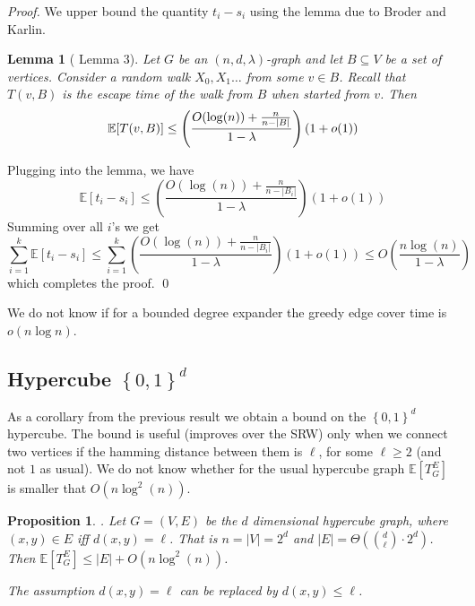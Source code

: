 \documentclass[12pt,a4paper]{article}
\newcommand{\zo}{ \left\{0,1\right\} }
\newcommand{\0}{{\bf 0}}
\newcommand{\seq}{\subseteq}
\newcommand{\E}{{\mathbb E}}
\newtheorem{proposition}[theorem]{Proposition}
\newtheorem{lemma}[theorem]{Lemma}
\begin{document}
    \begin{proof}
    We upper bound the quantity $t_i - s_i$ using the lemma due to Broder and Karlin.

    \begin{lemma}[\cite{BroderKarlin89} Lemma 3]
        Let $G$ be an $(n,d,\lambda)$-graph and let $B \seq V$ be a set of vertices.
        Consider a random walk $X_0, X_1 \dots$ from some $v \in B$.
        Recall that $T(v,B)$ is the escape time of the walk from $B$ when started from $v$.
        Then
        \[
            \E[T(v,B)] \leq \left( \frac{O( \log(n) ) + \frac{n}{n-|B|}}{1 - \lambda} \right) (1 + o(1))
    \qedhere\]
    \end{lemma}
    Plugging into the lemma, we have
    \[
        \E[t_i - s_i]  \leq  \left( \frac{O( \log(n) ) + \frac{n}{n-|B_i|}}{1 - \lambda} \right) (1 + o(1))
    \]
    Summing over all $i$'s we get
    \[
        \sum_{i=1}^{k} \E[t_i - s_i] \leq \sum_{i=1}^k \left( \frac{O( \log(n) ) + \frac{n}{n-|B_i|}}{1 - \lambda} \right) (1 + o(1))
                \leq O \left(\frac{n \log(n)}{1 - \lambda} \right)
    \]
    which completes the proof. \qed
    \end{proof}

    We do not know if for a bounded degree expander the greedy edge cover time is $o(n \log n)$.

\subsection{Hypercube $\zo^d$}\label{subsec:zo^d}

    As a corollary from the previous result we obtain a bound on the $\zo^d$ hypercube.
    The bound is useful (improves over the SRW) only
    when we connect two vertices if the hamming distance between them is $\ell$, for some $\ell \geq 2$ (and not $1$ as usual).
    We do not know whether for the usual hypercube graph $\E[T^E_G]$ is smaller that $O(n \log^2(n))$.

    \begin{proposition}\label{thm:zo^d}.
        Let $G=(V,E)$ be the $d$ dimensional hypercube graph, where $(x,y) \in E$ iff $d(x,y) = \ell$.
        That is $n = |V| = 2^d$ and $|E| = \Theta( {d \choose \ell} \cdot 2^d )$.
        Then $\E[T^E_G] \leq |E| + O ( n \log^2(n) )$.

        The assumption $d(x,y) = \ell$ can be replaced by $d(x,y) \leq \ell$.
    \end{proposition}
\end{document}
